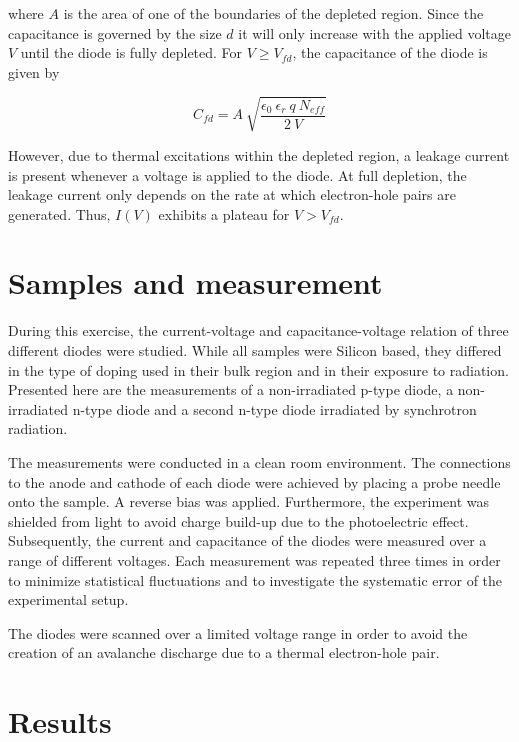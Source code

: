 \documentclass[11pt,a4paper]{report}
\begin{document}
where $A$ is the area of one of the boundaries of the depleted region. Since the capacitance is governed by the size $d$ it will only increase with the applied voltage $V$ until the diode is fully depleted. For $V \geq V_{fd}$, the capacitance of the diode is given by

\begin{equation}
  \label{eq:1}
   C_{fd} = A ~ \sqrt{\frac{\epsilon_0 ~ \epsilon_r ~q ~ N_{eff}}{2 ~ V}}
\end{equation}

However, due to thermal excitations within the depleted region, a leakage current is present whenever a voltage is applied to the diode.
At full depletion, the leakage current only depends on the rate at which electron-hole pairs are generated. Thus, $I(V)$ exhibits a plateau for $V>V_{fd}$. \\


\section*{Samples and measurement}
\label{sec:samples}

During this exercise, the current-voltage and capacitance-voltage relation of three different diodes were studied. While all samples were Silicon based, they differed in the type of doping used in their bulk region and in their exposure to radiation.
Presented here are the measurements of a non-irradiated p-type diode, a non-irradiated n-type diode and a second n-type diode irradiated by synchrotron radiation. 

The measurements were conducted in a clean room environment. The connections to the anode and cathode of each diode were achieved by placing a probe needle onto the sample.
A reverse bias was applied.
Furthermore, the experiment was shielded from light to avoid charge build-up due to the photoelectric effect. Subsequently, the current and capacitance of the diodes were measured over a range of different voltages. Each measurement was repeated three times in order to minimize statistical fluctuations and to investigate the systematic error of the experimental setup.

The diodes were scanned over a limited voltage range in order to avoid the creation of an avalanche discharge due to a thermal electron-hole pair.


\section*{Results}
\end{document}
